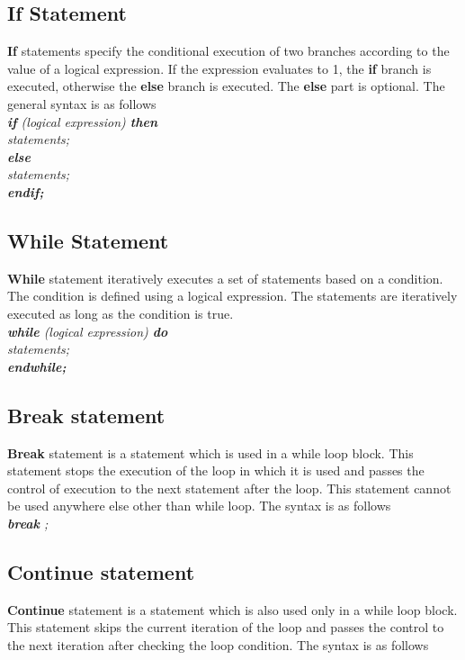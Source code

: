\documentclass[11pt]{article}
\begin{document}
\subsection{If Statement}
\textbf{If} statements specify the conditional execution of two branches according to the value of a logical expression. If the expression evaluates to 1, the \textbf{if} branch is executed, otherwise the \textbf{else}  branch is executed. The \textbf{else} part is optional. The general syntax is as follows  \\

\textit{
\textbf{if} (logical expression) \textbf{then}  \\
 \indent \indent statements; \\
\indent \textbf{else} \\
\indent  \indent statements; \\
\indent \textbf{endif;}  \\
}



\subsection{While Statement}
\textbf{While} statement iteratively executes a set of statements based on a condition. The condition is defined using a logical expression.  The statements are iteratively executed as long as the condition is true.\\

\textit{
\textbf{while} (logical expression) \textbf{do}  \\
 \indent \indent statements; \\
\indent \textbf{endwhile;}  \\
}


\subsection{Break statement}
\textbf{Break} statement is a statement which is used in a while loop block. This statement stops the execution of the loop in which it is used and passes the control of execution to the next statement after the loop. This statement cannot be used anywhere else other than while loop. The syntax is as follows\\

\textit{\textbf{break} ;}


\subsection{Continue statement}
\textbf{Continue} statement is a statement which is also used only in a while loop block. This statement skips the current iteration of the loop and passes the control to the next iteration after checking the loop condition. The syntax is as follows\\
\end{document}
